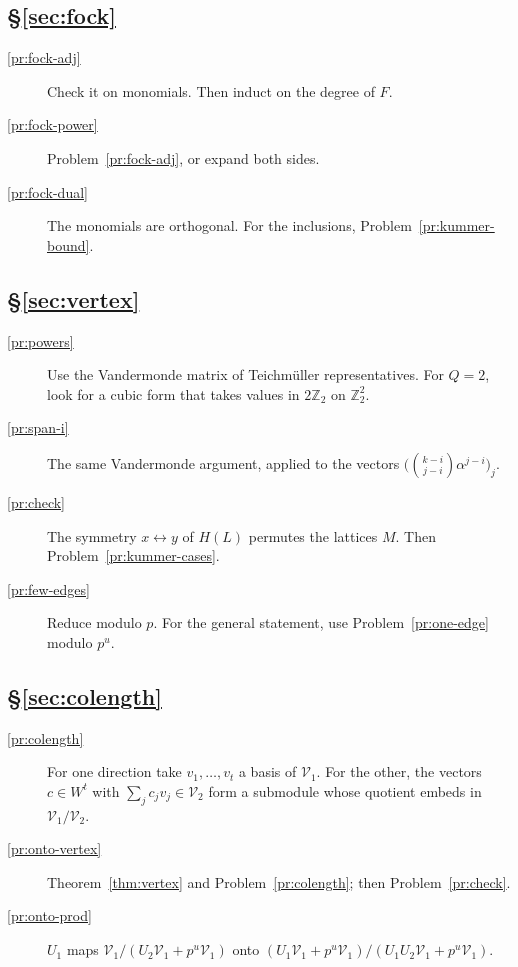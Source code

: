 \documentclass[reqno]{amsart}
\theoremstyle{definition}
\theoremstyle{plain}
\newcommand{\Z}{\mathbb{Z}}
\begin{document}
\subsection*{\S\ref{sec:fock}}
\begin{description}
\item[\ref{pr:fock-adj}] Check it on monomials.  Then induct on the degree of \(F\).
\item[\ref{pr:fock-power}] Problem~\ref{pr:fock-adj}, or expand both sides.
\item[\ref{pr:fock-dual}] The monomials are orthogonal.  For the inclusions, Problem~\ref{pr:kummer-bound}.
\end{description}

\subsection*{\S\ref{sec:vertex}}
\begin{description}
\item[\ref{pr:powers}] Use the Vandermonde matrix of Teichm\"uller representatives.  For \(Q = 2\), look for a cubic form that takes values in \(2\Z_2\) on \(\Z_2^2\).
\item[\ref{pr:span-i}] The same Vandermonde argument, applied to the vectors \(\bigl(\binom{k-i}{j-i} \alpha^{j-i}\bigr)_j\).
\item[\ref{pr:check}] The symmetry \(x \leftrightarrow y\) of \(H(L)\) permutes the lattices \(M\).  Then Problem~\ref{pr:kummer-cases}.
\item[\ref{pr:few-edges}] Reduce modulo \(p\).  For the general statement, use Problem~\ref{pr:one-edge} modulo \(p^u\).
\end{description}

\subsection*{\S\ref{sec:colength}}
\begin{description}
\item[\ref{pr:colength}] For one direction take \(v_1, \dots, v_t\) a basis of \(\mathcal V_1\).  For the other, the vectors \(c \in W^t\) with \(\sum_j c_j v_j \in \mathcal V_2\) form a submodule whose quotient embeds in \(\mathcal V_1/\mathcal V_2\).
\item[\ref{pr:onto-vertex}] Theorem~\ref{thm:vertex} and Problem~\ref{pr:colength}; then Problem~\ref{pr:check}.
\item[\ref{pr:onto-prod}] \(U_1\) maps \(\mathcal V_1/(U_2\mathcal V_1 + p^u\mathcal V_1)\) onto \((U_1\mathcal V_1 + p^u\mathcal V_1)/(U_1U_2\mathcal V_1 + p^u\mathcal V_1)\).
\end{description}
\end{document}
